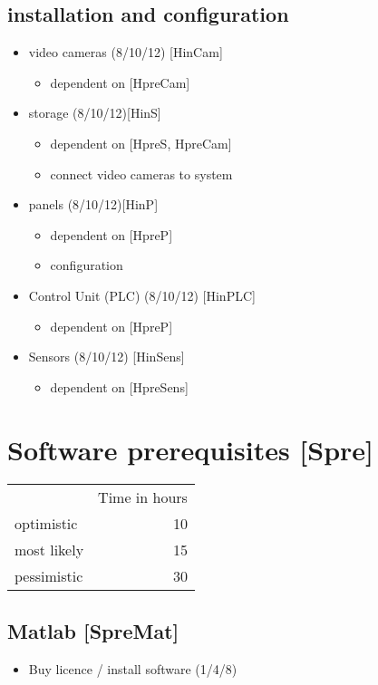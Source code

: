 \documentclass
[
 12pt, %
       DIV12,
       a4paper, %
       oneside, %
       titlepage, %
       parskip=half, %
       headings=normal, %
       listof=totoc, %
       bibliography=totoc, %
       index=totoc, %
       captions=tableheading, %
       ]{scrreprt}
\begin{document}
\section{installation and configuration}
\label{sec:org7c12187}
\begin{itemize}
\item video cameras (8/10/12) [HinCam] 
\begin{itemize}
\item dependent on [HpreCam]
\end{itemize}
\item storage  (8/10/12)[HinS]
\begin{itemize}
\item dependent on [HpreS, HpreCam]
\item connect video cameras to system
\end{itemize}
\item panels (8/10/12)[HinP]
\begin{itemize}
\item dependent on [HpreP]
\item configuration
\end{itemize}
\item Control Unit (PLC) (8/10/12) [HinPLC]
\begin{itemize}
\item dependent on [HpreP]
\end{itemize}
\item Sensors (8/10/12) [HinSens]
\begin{itemize}
\item dependent on [HpreSens]
\end{itemize}
\end{itemize}

\chapter{Software prerequisites [Spre]}
\label{sec:org180caa5}

\begin{center}
\begin{tabular}{lr}
 & Time in hours\\
optimistic & 10\\
most likely & 15\\
pessimistic & 30\\
\end{tabular}
\end{center}

\section{Matlab [SpreMat]}
\label{sec:orgda25cf6}
\begin{itemize}
\item Buy licence / install software  (1/4/8)
\end{itemize}
\end{document}
